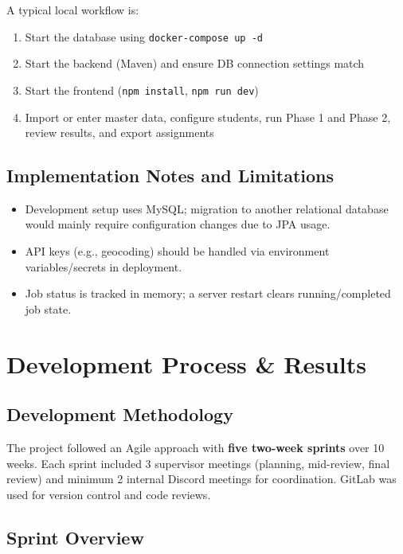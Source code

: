 \documentclass[12pt,a4paper]{report}
\begin{document}
A typical local workflow is:

\begin{enumerate}
    \item Start the database using \texttt{docker-compose up -d}
    \item Start the backend (Maven) and ensure DB connection settings match
    \item Start the frontend (\texttt{npm install}, \texttt{npm run dev})
    \item Import or enter master data, configure students, run Phase 1 and Phase 2, review results, and export assignments
\end{enumerate}

\section{Implementation Notes and Limitations}

\begin{itemize}
    \item Development setup uses MySQL; migration to another relational database would mainly require configuration changes due to JPA usage.
    \item API keys (e.g., geocoding) should be handled via environment variables/secrets in deployment.
    \item Job status is tracked in memory; a server restart clears running/completed job state.
\end{itemize}



\chapter{Development Process \& Results}

\section{Development Methodology}

The project followed an Agile approach with \textbf{five two-week sprints} over 10 weeks. Each sprint included 3 supervisor meetings (planning, mid-review, final review) and minimum 2 internal Discord meetings for coordination. GitLab was used for version control and code reviews.

\section{Sprint Overview}
\end{document}
